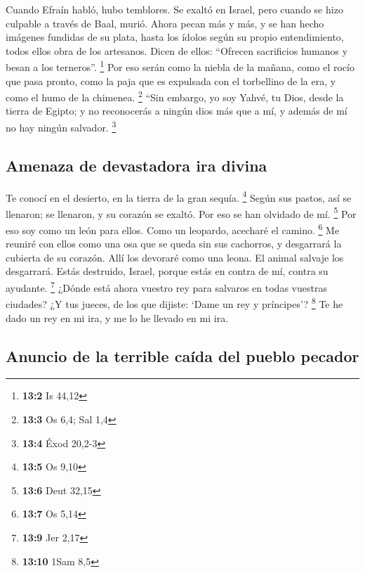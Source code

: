 \begin{paracol}{2}
 Cuando Efraín habló, hubo temblores. Se exaltó en Israel,
pero cuando se hizo culpable a través de Baal, murió. 
Ahora pecan más y más, y se han hecho imágenes fundidas de su plata,
hasta los ídolos según su propio entendimiento, todos ellos obra de los
artesanos. Dicen de ellos: ``Ofrecen sacrificios humanos y besan a los
terneros''. \footnote{\textbf{13:2} Is 44,12}  Por eso
serán como la niebla de la mañana, como el rocío que pasa pronto, como
la paja que es expulsada con el torbellino de la era, y como el humo de
la chimenea. \footnote{\textbf{13:3} Os 6,4; Sal 1,4} 
``Sin embargo, yo soy Yahvé, tu Dios, desde la tierra de Egipto; y no
reconocerás a ningún dios más que a mí, y además de mí no hay ningún
salvador. \footnote{\textbf{13:4} Éxod 20,2-3}

\hypertarget{amenaza-de-devastadora-ira-divina}{%
\subsection{Amenaza de devastadora ira
divina}\label{amenaza-de-devastadora-ira-divina}}

 Te conocí en el desierto, en la tierra de la gran sequía.
\footnote{\textbf{13:5} Os 9,10}  Según sus pastos, así se
llenaron; se llenaron, y su corazón se exaltó. Por eso se han olvidado
de mí. \footnote{\textbf{13:6} Deut 32,15}  Por eso soy
como un león para ellos. Como un leopardo, acecharé el camino.
\footnote{\textbf{13:7} Os 5,14}  Me reuniré con ellos
como una osa que se queda sin sus cachorros, y desgarrará la cubierta de
su corazón. Allí los devoraré como una leona. El animal salvaje los
desgarrará.  Estás destruido, Israel, porque estás en
contra de mí, contra su ayudante. \footnote{\textbf{13:9} Jer 2,17}
 ¿Dónde está ahora vuestro rey para salvaros en todas
vuestras ciudades? ¿Y tus jueces, de los que dijiste: `Dame un rey y
príncipes'? \footnote{\textbf{13:10} 1Sam 8,5}  Te he
dado un rey en mi ira, y me lo he llevado en mi ira.

\hypertarget{anuncio-de-la-terrible-cauxedda-del-pueblo-pecador}{%
\subsection{Anuncio de la terrible caída del pueblo
pecador}\label{anuncio-de-la-terrible-cauxedda-del-pueblo-pecador}}


\end{paracol}
